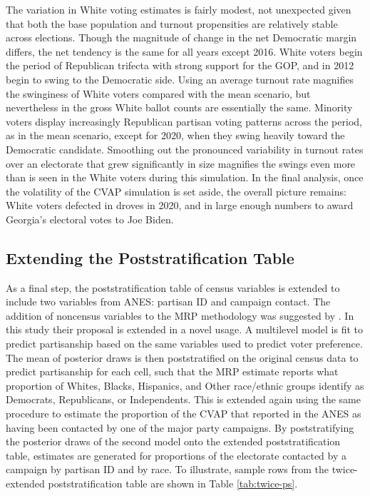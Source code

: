 The variation in White voting estimates is fairly modest, not unexpected given that both the base population and turnout propensities are relatively stable across elections. Though the magnitude of change in the net Democratic margin differs, the net tendency is the same for all years except 2016. White voters begin the period of Republican trifecta with strong support for the GOP, and in 2012 begin to swing to the Democratic side. Using an average turnout rate magnifies the swinginess of White voters compared with the mean scenario, but nevertheless in the gross White ballot counts are essentially the same. Minority voters display increasingly Republican partisan voting patterns across the period, as in the mean scenario, except for 2020, when they swing heavily toward the Democratic candidate. Smoothing out the pronounced variability in turnout rates over an electorate that grew significantly in size magnifies the swings even more than is seen in the White voters during this simulation. In the final analysis, once the volatility of the CVAP simulation is set aside, the overall picture remains: White voters defected in droves in 2020, and in large enough numbers to award Georgia's electoral votes to Joe Biden.              

\subsection{Extending the Poststratification Table}

As a final step, the poststratification table of census variables is extended to include two variables from ANES: partisan ID and campaign contact. The addition of noncensus variables to the MRP methodology was suggested by \citet{kastellec_polarizing_2015}. In this study their proposal is extended in a novel usage.  A multilevel model is fit to predict partisanship based on the same variables used to predict voter preference. The mean of posterior draws is then poststratified on the original census data to predict partisanship for each cell, such that the MRP estimate reports what proportion of Whites, Blacks, Hispanics, and Other race/ethnic groups identify as Democrats, Republicans, or Independents. This is extended again using the same procedure to estimate the proportion of the CVAP that reported in the ANES as having been contacted by one of the major party campaigns. By poststratifying the posterior draws of the second model onto the extended poststratification table, estimates are generated for proportions of the electorate contacted by a campaign by partisan ID and by race. To illustrate, sample rows from the twice-extended poststratification table are shown in Table \ref{tab:twice-ps}. 

